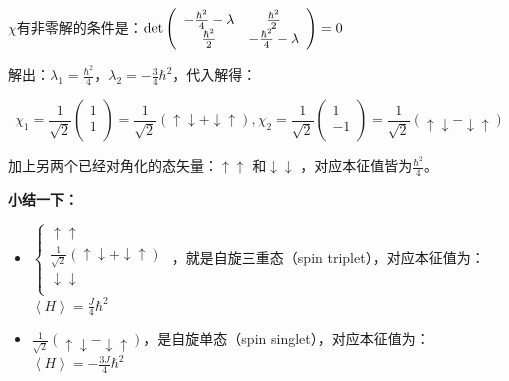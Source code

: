 $\chi$有非零解的条件是：$\det \left( {\begin{array}{*{20}c}
   { - \frac{{\hbar ^2 }}{4} - \lambda } & {\frac{{\hbar ^2 }}{2}}  \\
   {\frac{{\hbar ^2 }}{2}} & { - \frac{{\hbar ^2 }}{4} - \lambda }  \\
\end{array}} \right) = 0$


解出：$\lambda_1 = \frac{\hbar^2}{4}$，$\lambda_2 = - \frac{3}{4}
\hbar^2$，代入解得：

\begin{equation*}
  \chi _1  = \frac{1}{{\sqrt 2 }}\left( \begin{array}{l}
 1 \\
 1 \\
 \end{array} \right) = \frac{1}{{\sqrt 2 }}\left( { \uparrow  \downarrow  +  \downarrow  \uparrow }
 \right), \chi _2  = \frac{1}{{\sqrt 2 }}\left( \begin{array}{l}
 1 \\
  - 1 \\
 \end{array} \right) = \frac{1}{{\sqrt 2 }}\left( { \uparrow  \downarrow  -  \downarrow  \uparrow } \right)
\end{equation*}

加上另两个已经对角化的态矢量：$\uparrow \uparrow$ 和$\downarrow
\downarrow$ ，对应本征值皆为$\frac{\hbar^2}{4}$。



\textbf{小结一下：}


\begin{itemize}
  \item $\left\{ \begin{array}{l}
  \uparrow  \uparrow  \\
 \frac{1}{{\sqrt 2 }}\left( { \uparrow  \downarrow  +  \downarrow  \uparrow } \right) \\
  \downarrow  \downarrow  \\
 \end{array} \right.$
，就是自旋三重态（spin triplet），对应本征值为：$\left\langle H
\right\rangle = \frac{J}{4}\hbar^2$

  \item $\frac{1}{{\sqrt 2 }}\left( { \uparrow  \downarrow  -  \downarrow
\uparrow } \right)$，是自旋单态（spin
singlet），对应本征值为：$\left\langle H \right\rangle = -
\frac{3J}{4}\hbar^2$
\end{itemize}

